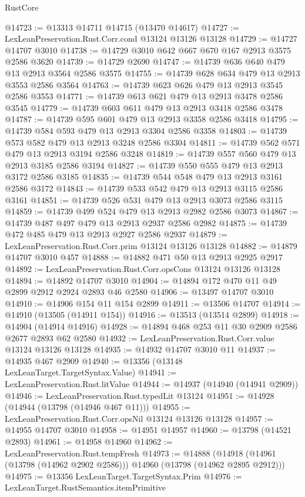 \begin{lexlean}{RustCore}
\begin{coremodule}
@14723 := @13313 @14711 @14715 (@13470 @14617)
@14727 := LexLeanPreservation.Rust.Corr.cond @13124 @13126 @13128
@14729 := @14727 @14707 @3010
@14738 := @14729 @3010 @642 @667 @670 @167 @2913 @3575 @2586 @3620
@14739 := @14729 @2690
@14747 := @14739 @636 @640 @479 @13 @2913 @3564 @2586 @3575
@14755 := @14739 @628 @634 @479 @13 @2913 @3553 @2586 @3564
@14763 := @14739 @623 @626 @479 @13 @2913 @3545 @2586 @3553
@14771 := @14739 @613 @621 @479 @13 @2913 @3478 @2586 @3545
@14779 := @14739 @603 @611 @479 @13 @2913 @3418 @2586 @3478
@14787 := @14739 @595 @601 @479 @13 @2913 @3358 @2586 @3418
@14795 := @14739 @584 @593 @479 @13 @2913 @3304 @2586 @3358
@14803 := @14739 @573 @582 @479 @13 @2913 @3248 @2586 @3304
@14811 := @14739 @562 @571 @479 @13 @2913 @3194 @2586 @3248
@14819 := @14739 @557 @560 @479 @13 @2913 @3185 @2586 @3194
@14827 := @14739 @550 @555 @479 @13 @2913 @3172 @2586 @3185
@14835 := @14739 @544 @548 @479 @13 @2913 @3161 @2586 @3172
@14843 := @14739 @533 @542 @479 @13 @2913 @3115 @2586 @3161
@14851 := @14739 @526 @531 @479 @13 @2913 @3073 @2586 @3115
@14859 := @14739 @499 @524 @479 @13 @2913 @2982 @2586 @3073
@14867 := @14739 @487 @497 @479 @13 @2913 @2937 @2586 @2982
@14875 := @14739 @472 @485 @479 @13 @2913 @2927 @2586 @2937
@14879 := LexLeanPreservation.Rust.Corr.prim @13124 @13126 @13128
@14882 := @14879 @14707 @3010 @457
@14888 := @14882 @471 @50 @13 @2913 @2925 @2917
@14892 := LexLeanPreservation.Rust.Corr.opsCons @13124 @13126 @13128
@14894 := @14892 @14707 @3010
@14904 := @14894 @172 @470 @11 @49 @2899 @2912 @2924 @2893 @46 @2580
@14906 := @13497 @14707 @3010
@14910 := @14906 @154 @11 @154 @2899
@14911 := @13506 @14707
@14914 := @14910 (@13505 (@14911 @154))
@14916 := @13513 (@13514 @2899)
@14918 := @14904 (@14914 @14916)
@14928 := @14894 @468 @253 @11 @30 @2909 @2586 @2677 @2893 @62 @2580
@14932 := LexLeanPreservation.Rust.Corr.value @13124 @13126 @13128
@14935 := @14932 @14707 @3010 @11
@14937 := @14935 @467 @2909
@14940 := @13356 (@13148 LexLeanTarget.TargetSyntax.Value)
@14941 := LexLeanPreservation.Rust.litValue
@14944 := @14937 (@14940 (@14941 @2909))
@14946 := LexLeanPreservation.Rust.typedLit @13124
@14951 := @14928 (@14944 (@13798 (@14946 @467 @11)))
@14955 := LexLeanPreservation.Rust.Corr.opsNil @13124 @13126 @13128
@14957 := @14955 @14707 @3010
@14958 := @14951 @14957
@14960 := @13798 (@14521 @2893)
@14961 := @14958 @14960
@14962 := LexLeanPreservation.Rust.tempFresh
@14973 := @14888
    (@14918 (@14961 (@13798 (@14962 @2902 @2586))) @14960 (@13798 (@14962 @2895 @2912)))
@14975 := @13356 LexLeanTarget.TargetSyntax.Prim
@14976 := LexLeanTarget.RustSemantics.itemPrimitive

\end{coremodule}
\end{lexlean}
